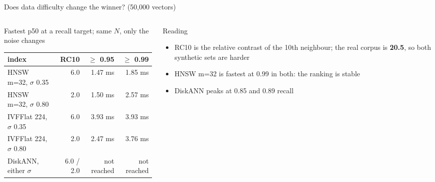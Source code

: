 \documentclass[aspectratio=169,10pt]{beamer}
\begin{document}
\begin{frame}[shrink=5]{Does data difficulty change the winner? (50,000 vectors)}
\begin{columns}[T]
\begin{column}{0.54\textwidth}
\begin{block}{Fastest p50 at a recall target; same $N$, only the noise changes}
\begin{tabular}{@{}lrrr@{}}
\toprule
index & RC10 & $\ge$ 0.95 & $\ge$ 0.99\\
\midrule
HNSW m=32, $\sigma$ 0.35 & 6.0 & 1.47 ms & 1.85 ms\\
HNSW m=32, $\sigma$ 0.80 & 2.0 & 1.50 ms & 2.57 ms\\
IVFFlat 224, $\sigma$ 0.35 & 6.0 & 3.93 ms & 3.93 ms\\
IVFFlat 224, $\sigma$ 0.80 & 2.0 & 2.47 ms & 3.76 ms\\
DiskANN, either $\sigma$ & 6.0 / 2.0 & not reached & not reached\\
\bottomrule
\end{tabular}
\end{block}
\end{column}
\begin{column}{0.44\textwidth}
\begin{block}{Reading}
\begin{itemize}
  \item RC10 is the relative contrast of the 10th neighbour; the real corpus is \textbf{20.5}, so both synthetic sets are harder
  \item HNSW m=32 is fastest at 0.99 in both: the ranking is stable
  \item DiskANN peaks at 0.85 and 0.89 recall
\end{itemize}
\end{block}
\end{column}
\end{columns}
\end{frame}
\end{document}
